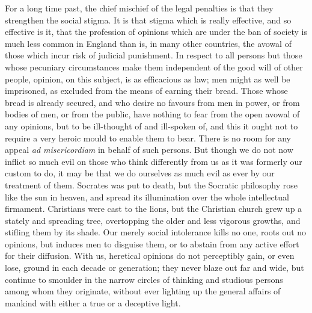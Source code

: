 \documentclass[11pt,openany]{book}
\begin{document}
For a long time past, the chief mischief of the legal penalties is that they strengthen the social stigma. It is that stigma which is really effective, and so effective is it, that the profession of opinions which are under the ban of society is much less common in England than is, in many other countries, the avowal of those which incur risk of judicial punishment. In respect to all persons but those whose pecuniary circumstances make them independent of the good will of other people, opinion, on this subject, is as efficacious as law; men might as well be imprisoned, as excluded from the means of earning their bread. Those whose bread is already secured, and who desire no favours from men in power, or from bodies of men, or from the public, have nothing to fear from the open avowal of any opinions, but to be ill-thought of and ill-spoken of, and this it ought not to require a very heroic mould to enable them to bear. There is no room for any appeal \emph{ad misericordiam} in behalf of such persons. But though we do not now inflict so much evil on those who think differently from us as it was formerly our custom to do, it may be that we do ourselves as much evil as ever by our treatment of them. Socrates was put to death, but the Socratic philosophy rose like the sun in heaven, and spread its illumination over the whole intellectual firmament. Christians were cast to the lions, but the Christian church grew up a stately and spreading tree, overtopping the older and less vigorous growths, and stifling them by its shade. Our merely social intolerance kills no one, roots out no opinions, but induces men to disguise them, or to abstain from any active effort for their diffusion. With us, heretical opinions do not perceptibly gain, or even lose, ground in each decade or generation; they never blaze out far and wide, but continue to smoulder in the narrow circles of thinking and studious persons among whom they originate, without ever lighting up the general affairs of mankind with either a true or a deceptive light.
\end{document}
